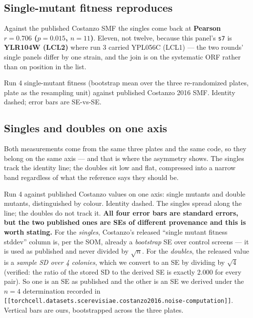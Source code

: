 \subsection{Single-mutant fitness reproduces}

Against the published Costanzo SMF the singles come back at \textbf{Pearson $r=0.706$
($p=0.015$, $n=11$)}. Eleven, not twelve, because this panel's \texttt{s7} is
\textbf{YLR104W (LCL2)} where run 3 carried YPL056C (LCL1) --- the two rounds' single panels
differ by one strain, and the join is on the systematic ORF rather than on position in the
list.

%
  {Run 4 single-mutant fitness (bootstrap mean over the three re-randomized plates, plate as
   the resampling unit) against published Costanzo 2016 SMF. Identity dashed; error bars are
   SE-vs-SE.}

\subsection{Singles and doubles on one axis}

Both measurements come from the same three plates and the same code, so they belong on the
same axis --- and that is where the asymmetry shows. The singles track the identity line;
the doubles sit low and flat, compressed into a narrow band regardless of what the reference
says they should be.

%
  {Run 4 against published Costanzo values on one axis: single mutants and double mutants,
   distinguished by colour. Identity dashed. The singles spread along the line; the doubles
   do not track it.
   \textbf{All four error bars are standard errors, but the two published ones are SEs of
   different provenance and this is worth stating.} For the \emph{singles}, Costanzo's
   released ``single mutant fitness stddev'' column is, per the SOM, already a
   \emph{bootstrap} SE over control screens --- it is used as published and never divided by
   $\sqrt{n}$. For the \emph{doubles}, the released value is a \emph{sample SD over 4
   colonies}, which we convert to an SE by dividing by $\sqrt{4}$ (verified: the ratio of the
   stored SD to the derived SE is exactly 2.000 for every pair). So one is an SE as
   published and the other is an SE we derived under the $n=4$ determination recorded in
   \texttt{[[torchcell.datasets.scerevisiae.costanzo2016.noise-computation]]}. Vertical bars
   are ours, bootstrapped across the three plates.}

